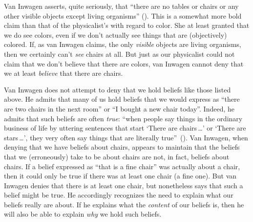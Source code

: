\documentclass[11pt]{article}
\begin{document}
\begin{spacing}{1.5}
Van Inwagen asserts, quite seriously, that ``there are no tables or
chairs or any other visible objects except living organisms''
(\citeyear[1]{inwagen1995}).  This is a somewhat more bold claim than
that of the physicalist's with regard to color.  She at least granted
that we do see colors, even if we don't actually see things that are
(objectively) colored.  If, as van Inwagen claims, the only {\em
  visible} objects are living organisms, then we certainly can't {\em
  see} chairs at all.  But just as our physicalist could not claim
that we don't believe that there are colors, van Inwagen cannot deny
that we at least {\em believe} that there are chairs.

Van Inwagen does not attempt to deny that we hold beliefs like those
listed above.  He admits that many of us hold beliefs that we would
express as ``there are two chairs in the next room'' or ``I bought a
new chair today''.  Indeed, he admits that such beliefs are often {\em
  true}: ``when people say things in the ordinary business of life by
uttering sentences that start `There are chairs\,\ldots ' or `There
are stars\,\ldots ', they very often say things that are literally
true''~(\citeyear[102]{inwagen1995}).  Van Inwagen, when denying that
we have beliefs about chairs, appears to maintain that the beliefs
that we (erroneously) take to be about chairs are not, in fact,
beliefs about chairs.  If a belief expressed as ``that is a fine
chair'' was actually about a chair, then it could only be true if
there was at least one chair (a fine one).  But van Inwagen denies
that there is at least one chair, but nonetheless says that such a
belief might be true.  He accordingly recognizes the need to explain
what our beliefs really are about.  If he explains what the {\em
  content} of our beliefs is, then he will also be able to explain
{\em why} we hold such beliefs.

\ifstandalone
\end{spacing}


\fi
\end{document}
